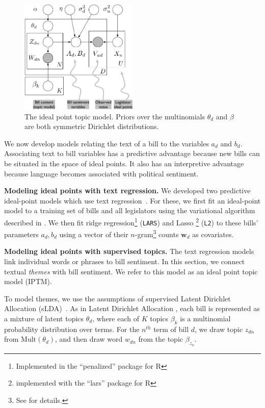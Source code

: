 \begin{figure}[t]
\center
\includegraphics[width=0.5\textwidth]{chapter_spatial_voting_with_text/figures/ideal-point-topic-model.pdf}
\caption{The ideal point topic model.  Priors over the multinomials
$\theta_d$ and $\beta$ are both symmetric Dirichlet distributions.}
\label{fig:legis_gm}
\end{figure}

We now develop models relating the text of a bill to the variables
$a_d$ and $b_d$.  Associating text to bill variables has a predictive
advantage because new bills can be situated in the space of ideal
points.  It also has an interpretive advantage because language
becomes associated with political sentiment.

\textbf{Modeling ideal points with text regression.} We developed two
predictive ideal-point models which use text
regression~\cite{kogan:2009}.  For these, we first fit an ideal-point
model to a training set of bills and all legislators using the
variational algorithm described in .  We then fit ridge
regression\footnote{Implemented in the ``penalized'' package for R}
(\verb!LARS!) and Lasso
\footnote{implemented with the ``lars'' package for R} (\verb!L2!) to
these bills' parameters $a_d, b_d$ using a vector of their
$n$-gram\footnote{See  for details.}  counts $\bm
w_{d}$ as covariates.

\textbf{Modeling ideal points with supervised topics.} The text
regression models link individual words or phrases to bill sentiment.
In this section, we connect textual \emph{themes} with bill sentiment.
We refer to this model as an ideal point topic model (IPTM).

To model themes, we use the assumptions of supervised Latent Dirichlet
Allocation (sLDA)~\cite{blei:2008}.  As in Latent Dirichlet Allocation
\cite{blei:2003}, each bill is represented as a mixture of latent
topics $\theta_d$, where each of $K$ topics $\beta_k$ is a multinomial
probability distribution over terms.  For the $n^{th}$ term of bill
$d$, we draw topic $z_{dn}$ from $\mbox{Mult}(\theta_d)$, and then
draw word $w_{dn}$ from the topic $\beta_{z_n}$.

